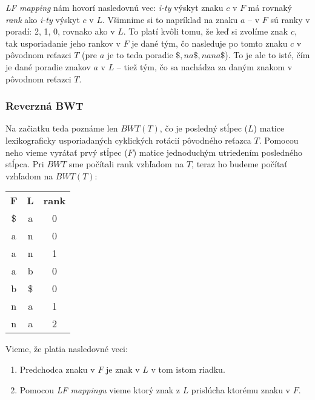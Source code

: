     \emph{LF mapping} nám hovorí nasledovnú vec: \emph{i-ty} výskyt znaku $c$ v $F$ má rovnaký \emph{rank} ako \emph{i-ty} výskyt $c$ v $L$. Všimnime si to napríklad na znaku $a$ -- v $F$ sú ranky v poradí: 2, 1, 0, rovnako ako v $L$. To platí kvôli tomu, že keď si zvolíme znak $c$, tak usporiadanie jeho rankov v $F$ je dané tým, čo nasleduje po tomto znaku $c$ v pôvodnom reťazci $T$ (pre $a$ je to teda poradie $\$, na\$, nana\$$). To je ale to isté, čím je dané poradie znakov $a$ v $L$ -- tiež tým, čo sa nachádza za daným znakom v pôvodnom reťazci $T$.
    
    \subsubsection{Reverzná BWT}
        
     Na začiatku teda poznáme len $BWT(T)$, čo je posledný stĺpec ($L$) matice lexikograficky usporiadaných cyklických rotácií pôvodného reťazca $T$. Pomocou neho vieme vyrátať prvý stĺpec ($F$) matice jednoduchým utriedením posledného stĺpca. Pri $BWT$ sme počítali rank vzhľadom na $T$, teraz ho budeme počítať vzhľadom na $BWT(T)$:
    
    \bigskip
    
    \begin{center}
        \begin{tabular}{ c c c }
            \textbf{F}   & \textbf{L} & \textbf{rank} \\  
            \$           & a          & 0             \\
            a            & n          & 0             \\
            a            & n          & 1             \\
            a            & b          & 0             \\
            b            & \$         & 0             \\
            n            & a          & 1             \\
            n            & a          & 2             \\
        \end{tabular}
    \end{center}
    
    \bigskip
    
    Vieme, že platia nasledovné veci:
    
    \begin{enumerate}
        \item{Predchodca znaku v $F$ je znak v $L$ v tom istom riadku.}
        \item{Pomocou \emph{LF mappingu} vieme ktorý znak z $L$ prislúcha ktorému znaku v $F$.}
    \end{enumerate}
    
